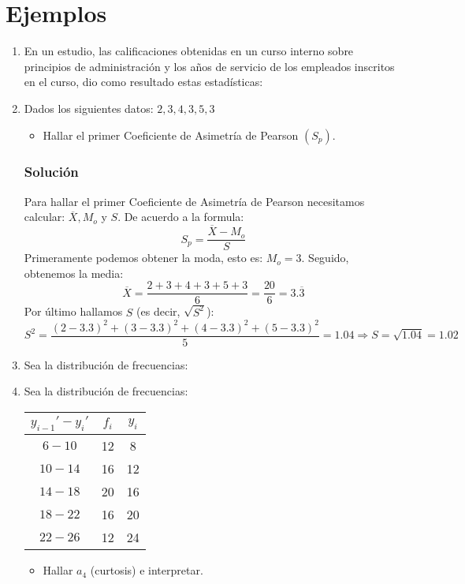 \section{Ejemplos}
\begin{enumerate}
\item En un estudio, las calificaciones obtenidas en un curso interno sobre principios de administración y los años de servicio de los empleados inscritos en el curso, dio como resultado estas estadísticas:


\item Dados los siguientes datos: $2,3,4,3,5,3$
\begin{itemize}
\item Hallar el primer Coeficiente de Asimetría de Pearson $(S_p)$.
\end{itemize}
\subsubsection{Solución}
Para hallar el primer Coeficiente de Asimetría de Pearson necesitamos calcular: $\overline{X}, M_o$ y $S$. De acuerdo a la formula:$$S_p = \dfrac{\overline{X}-M_o}{S}$$
Primeramente podemos obtener la moda, esto es: $M_o=3$. Seguido, obtenemos la media:
$$\overline{X}=\dfrac{2+3+4+3+5+3}{6}=\dfrac{20}{6}=3.\overline{3}$$
Por último hallamos $S$ (es decir, $\sqrt{S^2}$):
$$S^2=\dfrac{(2-3.3)^2+(3-3.3)^2+(4-3.3)^2+(5-3.3)^2}{5}=1.04 \Rightarrow S=\sqrt{1.04}=1.02$$
 
\item Sea la distribución de frecuencias:
\item Sea la distribución de frecuencias:
\begin{center}
\begin{tabular}{|c|c|c|}
\hline 
$y_{i-1}'-y_i'$ & $f_i$ & $y_i$ \\ 
\hline 
$6-10$ & 12 & 8 \\ 
\hline 
$10-14$ & 16 & 12 \\ 
\hline 
$14-18$ & 20 & 16 \\ 
\hline 
$18-22$ & 16 & 20 \\ 
\hline 
$22-26$ & 12 & 24 \\ 
\hline 
\end{tabular} 
\end{center}
\begin{itemize}
\item Hallar $a_4$ (curtosis) e interpretar.
\end{itemize}

\end{enumerate}
